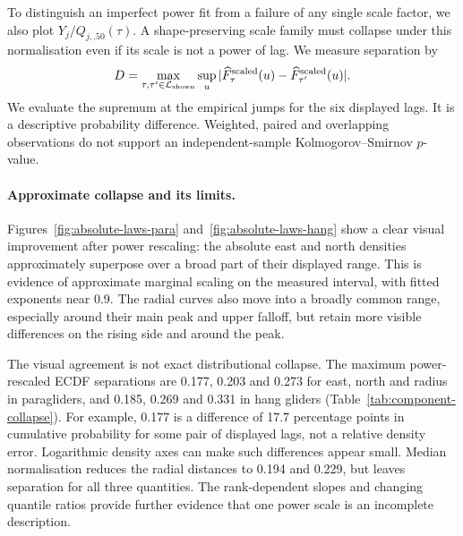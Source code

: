 To distinguish an imperfect power fit from a failure of any single scale factor,
we also plot $Y_j/Q_{j,.50}(\tau)$. A shape-preserving scale family must collapse
under this normalisation even if its scale is not a power of lag. We measure
separation by
\begin{equation}
 D=\max_{\tau,\tau'\in\mathcal L_{\rm shown}}\sup_u
       |\widehat F^{\rm scaled}_{\tau}(u)
        -\widehat F^{\rm scaled}_{\tau'}(u)|.
 \label{eq:ecdf-collapse-distance}
\end{equation}
We evaluate the supremum at the empirical jumps for the six displayed lags.
It is a descriptive probability difference. Weighted, paired and overlapping
observations do not support an independent-sample Kolmogorov--Smirnov $p$-value.

\begin{table}[tb]
 \centering\small
 \caption{Candidate common magnitude exponent and largest pairwise ECDF separation
 among the six displayed lags. $D_{\rm power}$ uses the fitted power scale;
 $D_{\rm median}$ uses each lag's own median. A distance of 0.10 is a ten-percentage-point
 cumulative probability difference somewhere in the rescaled distribution.}
 \label{tab:component-collapse}
 
\end{table}

\paragraph{Approximate collapse and its limits.}
Figures~\ref{fig:absolute-laws-para} and~\ref{fig:absolute-laws-hang} show a
clear visual improvement after power rescaling: the absolute east and north
densities approximately superpose over a broad part of their displayed range.
This is evidence of approximate marginal scaling on the measured interval,
with fitted exponents near 0.9. The radial curves also move into a broadly
common range, especially around their main peak and upper falloff, but retain
more visible differences on the rising side and around the peak.

The visual agreement is not exact distributional collapse. The maximum
power-rescaled ECDF separations are 0.177, 0.203 and 0.273 for east, north and
radius in paragliders, and 0.185, 0.269 and 0.331 in hang gliders
(Table~\ref{tab:component-collapse}). For example, 0.177 is a difference of
17.7 percentage points in cumulative probability for some pair of displayed
lags, not a relative density error. Logarithmic density axes can make such
differences appear small. Median normalisation reduces the radial distances
to 0.194 and 0.229, but leaves separation for all three quantities. The
rank-dependent slopes and changing quantile ratios provide further evidence
that one power scale is an incomplete description.

